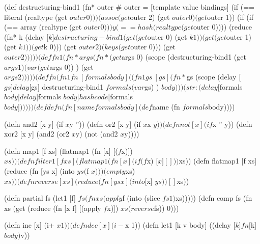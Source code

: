 \documentclass{report}
\begin{document}
\begin{xhcode}
(def destructuring-bind1
  (fn* outer        # outer = [template value bindings]
    (if (== literal (realtype (get $outer 0)))
      (assoc (get $outer 2) (get $outer 0) (get $outer 1))
      (if (if (== array (realtype (get $outer 0)))
            y
            (== hash (realtype (get $outer 0))))
        (reduce (fn* k
                  (delay [$k] destructuring-bind1
                              (get (get $outer 0) (get $k 1))
                              (get (get $outer 1) (get $k 1))
                              (get $k 0)))
                (get $outer 2)
                (keys (get $outer 0)))
        (get $outer 2)))))

(def fn1
  (fn* args
    (fn* (get $args 0)
      (scope (destructuring-bind1 (get $args 1)
                                  (var (get $args 0))
                                  {})
        (get $args 2)))))

(def fn
  (fn1 fn~ [formals body]
    ((fn1 gs~ [gs]
       (fn* $gs
         (scope (delay [$gs]
                 delay [$gs]
                 destructuring-bind1 $formals (var $gs) {})
           $body)))
     (str : (delay [$formals $body]
             delay [$formals $body]
             hashcode [$formals $body])))))

(def defn
  (fn [name formals body]
    (def $name (fn $formals $body))))

(defn and2 [x y] (if $x $y ''))
(defn or2  [x y] (if $x $x $y))
(defn not  [x]   (if $x '' y))
(defn xor2 [x y] (and2 (or2 $x $y) (not (and2 $x $y))))

(defn map1     [f xs] (flatmap1 (fn [x] [($f $x)]) $xs))
(defn filter1  [f xs] (flatmap1 (fn [x] (if (f $x) [$x] [])) $xs))
(defn flatmap1 [f xs] (reduce (fn [ys x] (into $ys ($f $x)))
                              (empty $xs)
                              $xs))

(defn reverse [xs] (reduce (fn [ys x] (into [$x] $ys))
                           []
                           $xs))

(defn partial fs (let1 [f] $fs (fn xs (apply $f (into (slice $fs 1) $xs)))))
(defn comp    fs (fn xs (get (reduce (fn [x f] [(apply $f $x)])
                                     $xs
                                     (reverse $fs))
                             0)))

(defn inc [x] (i+ $x 1))
(defn dec [x] (i- $x 1))
(defn let1 [k v body] ((delay [$k] fn [$k] $body) $v))


\end{xhcode}
\end{document}
